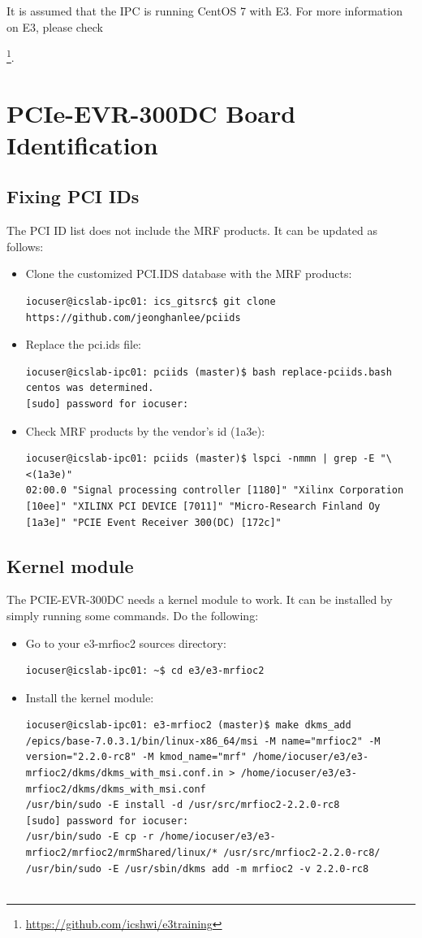 \documentclass[11pt
  , a4paper
  , article
  , oneside
  , showtrims
]{memoir}
\begin{document}
It is assumed that the IPC is running CentOS 7 with E3. For more information on E3, please check {\footnote{\url{https://github.com/icshwi/e3training}}.\\


\section{PCIe-EVR-300DC Board Identification}

\subsection{Fixing PCI IDs}
The PCI ID list does not include the MRF products. It can be updated as follows:
\begin{itemize}
\item Clone the customized PCI.IDS database with the MRF products:
\begin{lstlisting}[style=termstyle]
iocuser@icslab-ipc01: ics_gitsrc$ git clone https://github.com/jeonghanlee/pciids
\end{lstlisting}
\item Replace the pci.ids file:
\begin{lstlisting}[style=termstyle]
iocuser@icslab-ipc01: pciids (master)$ bash replace-pciids.bash
centos was determined.
[sudo] password for iocuser:
\end{lstlisting}
\item Check MRF products by the vendor's id (1a3e):
\begin{lstlisting}[style=termstyle]
iocuser@icslab-ipc01: pciids (master)$ lspci -nmmn | grep -E "\<(1a3e)"
02:00.0 "Signal processing controller [1180]" "Xilinx Corporation [10ee]" "XILINX PCI DEVICE [7011]" "Micro-Research Finland Oy [1a3e]" "PCIE Event Receiver 300(DC) [172c]"
\end{lstlisting}
\end{itemize}

\subsection{Kernel module}
The PCIE-EVR-300DC needs a kernel module to work. It can be installed by simply running some commands. Do the following:
\begin{itemize}
\item Go to your e3-mrfioc2 sources directory:
\begin{lstlisting}[style=termstyle]
iocuser@icslab-ipc01: ~$ cd e3/e3-mrfioc2
\end{lstlisting}
\item Install the kernel module:
\begin{lstlisting}[style=termstyle]
iocuser@icslab-ipc01: e3-mrfioc2 (master)$ make dkms_add
/epics/base-7.0.3.1/bin/linux-x86_64/msi -M name="mrfioc2" -M  version="2.2.0-rc8" -M kmod_name="mrf" /home/iocuser/e3/e3-mrfioc2/dkms/dkms_with_msi.conf.in > /home/iocuser/e3/e3-mrfioc2/dkms/dkms_with_msi.conf
/usr/bin/sudo -E install -d /usr/src/mrfioc2-2.2.0-rc8
[sudo] password for iocuser:
/usr/bin/sudo -E cp -r /home/iocuser/e3/e3-mrfioc2/mrfioc2/mrmShared/linux/* /usr/src/mrfioc2-2.2.0-rc8/
/usr/bin/sudo -E /usr/sbin/dkms add -m mrfioc2 -v 2.2.0-rc8


\end{lstlisting}
\end{itemize}}
\end{document}
